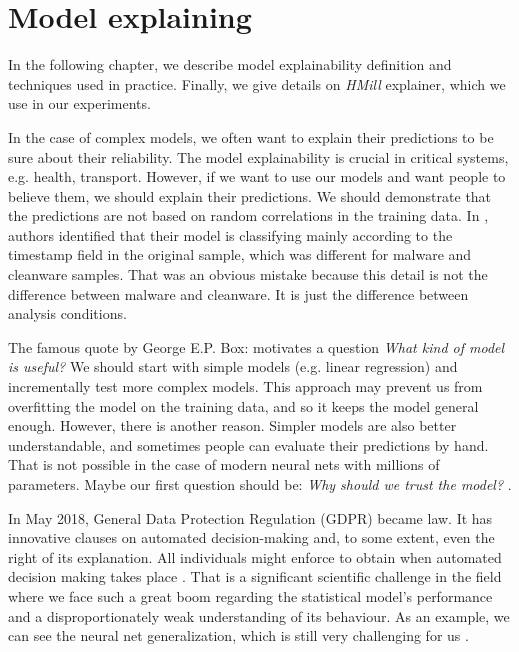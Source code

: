 \chapter{Model explaining} \label{chap:expth}
In the following chapter, we describe model explainability definition and techniques used in practice. Finally, we give details on \emph{HMill} explainer, which we use in our experiments.

In the case of complex models, we often want to explain their predictions to be sure about their reliability. The model explainability is crucial in critical systems, e.g. health, transport. However, if we want to use our models and want people to believe them, we should explain their predictions. We should demonstrate that the predictions are not based on random correlations in the training data. In \cite{Pevny2020}, authors identified that their model is classifying mainly according to the timestamp field in the original sample, which was different for malware and cleanware samples. That was an obvious mistake because this detail is not the difference between malware and cleanware. It is just the difference between analysis conditions.

The famous quote by George E.P. Box:  motivates a question \emph{What kind of model is useful?} We should start with simple models (e.g. linear regression) and incrementally test more complex models. This approach may prevent us from overfitting the model on the training data, and so it keeps the model general enough. However, there is another reason. Simpler models are also better understandable, and sometimes people can evaluate their predictions by hand. That is not possible in the case of modern neural nets with millions of parameters. Maybe our first question should be: \emph{Why should we trust the model?} \cite{Ribeiro2016}.

In May 2018, General Data Protection Regulation (GDPR) became law. It has innovative clauses on automated decision-making and, to some extent, even the right of its explanation. All individuals might enforce to obtain  when automated decision making takes place \cite{Guidotti2018}. That is a significant scientific challenge in the field where we face such a great boom regarding the statistical model's performance and a disproportionately weak understanding of its behaviour. As an example, we can see the neural net generalization, which is still very challenging for us \cite{Zhang2016}.

